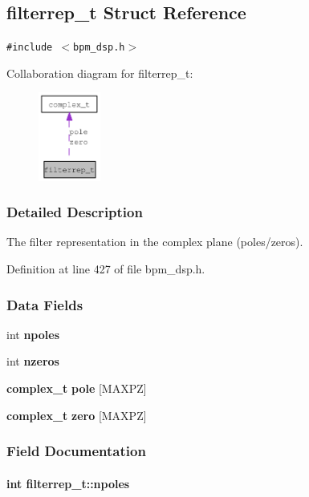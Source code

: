 \subsection{filterrep\_\-t Struct Reference}
\label{structfilterrep__t}
{\tt \#include $<$bpm\_\-dsp.h$>$}

Collaboration diagram for filterrep\_\-t:\nopagebreak
\begin{figure}[H]
\begin{center}
\leavevmode
\includegraphics[width=58pt]{structfilterrep__t__coll__graph}
\end{center}
\end{figure}


\subsubsection{Detailed Description}
The filter representation in the complex plane (poles/zeros). 

Definition at line 427 of file bpm\_\-dsp.h.\subsubsection*{Data Fields}
\begin{CompactItemize}
\item 
int {\bf npoles}
\item 
int {\bf nzeros}
\item 
{\bf complex\_\-t} {\bf pole} [MAXPZ]
\item 
{\bf complex\_\-t} {\bf zero} [MAXPZ]
\end{CompactItemize}


\subsubsection{Field Documentation}
\paragraph[npoles]{\setlength{\rightskip}{0pt plus 5cm}int {\bf filterrep\_\-t::npoles}}\hfill\label{structfilterrep__t_696051b6536b2d1416a6fd035998d402}


